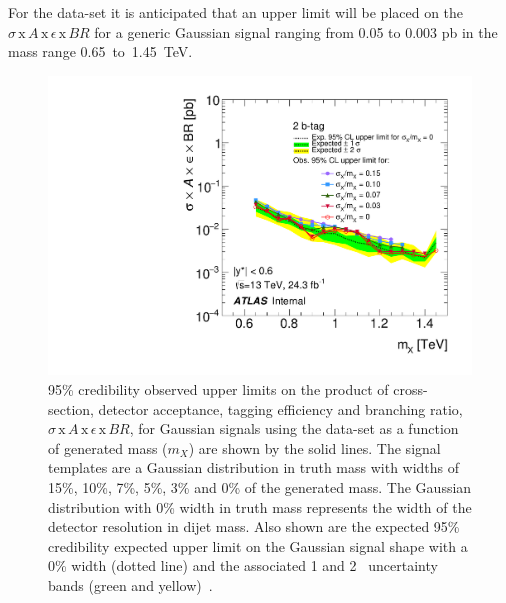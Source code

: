 For the \lm{} data-set it is anticipated that an upper limit will be placed on the $\sigma\,\text{x}\,\mathit{A}\,\text{x}\,\epsilon\,\text{x}\,\mathit{BR}$
for a generic Gaussian signal ranging from 0.05 to 0.003 pb in the mass range 0.65~to~1.45~TeV.

\begin{figure}[!ht]
  \begin{center}
    \includegraphics[width=0.9\linewidth, angle=0]{figs/Dibjet/lowmass/lim-gaussian.pdf}
  \vspace{-1.5em}
  \end{center}
  \caption[95\% credibility upper limits
    on the product of cross-section, detector acceptance, tagging efficiency and branching ratio
    for Gaussian signals using the \lm{} data-set.]
  {95\% credibility observed upper limits
    on the product of cross-section, detector acceptance, tagging efficiency and branching ratio,
    $\sigma\,\text{x}\,\mathit{A}\,\text{x}\,\epsilon\,\text{x}\,\mathit{BR}$,
    for Gaussian signals using the \lm{} data-set as a function of generated mass ($m_X$) are shown by the solid lines.
    The signal templates are a Gaussian distribution in truth mass with
    widths of 15\%, 10\%, 7\%, 5\%, 3\% and 0\% of the generated mass.
    The Gaussian distribution with 0\% width in truth mass represents the width of the detector resolution in dijet mass.
    Also shown are the expected 95\% credibility expected upper limit on the Gaussian signal shape with a 0\% width (dotted line)
    and the associated 1 and 2~\sigma{} uncertainty bands (green and yellow)~\cite{dibjet-full_int}.
  }
  \label{fig:lim-lowmass_gauss}
\end{figure}
